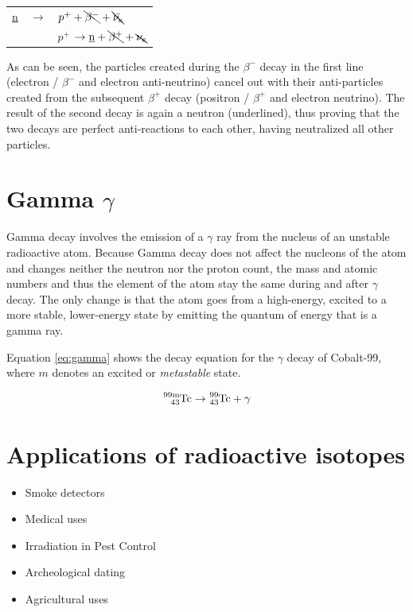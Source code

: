 \begin{table}[h!]
\centering
  \begin{tabular}{l l l}
    \underline{n} & $\to$ & $p^+ + \bcancel{\beta^-} + \bcancel{\bar{\nu_{e}}}$
    \\
    && $p^+$ $\to  \text{\underline{n}} + \bcancel{\beta^+} + \bcancel{\nu_{e}}$
  \end{tabular}
\end{table}

As can be seen, the particles created during the $\beta^-$ decay in the first line (electron / $\beta^-$ and electron anti-neutrino) cancel out with their anti-particles created from the subsequent $\beta^+$ decay (positron / $\beta^+$ and electron neutrino). The result of the second decay is again a neutron (underlined), thus proving that the two decays are perfect anti-reactions to each other, having neutralized all other particles.

\section*{Gamma $\gamma$}

Gamma decay involves the emission of a $\gamma$ ray from the nucleus of an unstable radioactive atom. Because Gamma decay does not affect the nucleons of the atom and changes neither the neutron nor the proton count, the mass and atomic numbers and thus the element of the atom stay the same during and after $\gamma$ decay. The only change is that the atom goes from a high-energy, excited to a more stable, lower-energy state by emitting the quantum of energy that is a gamma ray. 

Equation \ref{eq:gamma} shows the decay equation for the $\gamma$ decay of Cobalt-99, where $m$ denotes an excited or \emph{metastable} state.

\begin{equation}
  \ce{^{99m}_{43}Tc} \rightarrow \ce{^{99}_{43}Tc} + \gamma
  \label{eq:gamma}
\end{equation}

\pagebreak

\section*{Applications of radioactive isotopes}

\begin{itemize}
  \item Smoke detectors
  \item Medical uses
  \item Irradiation in Pest Control
  \item Archeological dating
  \item Agricultural uses
\end{itemize}


